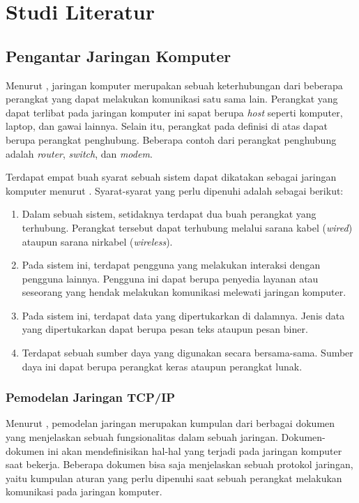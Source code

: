 \chapter{Studi Literatur}

\section{Pengantar Jaringan Komputer}
Menurut \textcite{forouzan2012}, jaringan komputer merupakan sebuah keterhubungan dari beberapa perangkat yang dapat melakukan komunikasi satu sama lain. Perangkat yang dapat terlibat pada jaringan komputer ini sapat berupa \emph{host} seperti komputer, laptop, dan gawai lainnya. Selain itu, perangkat pada definisi di atas dapat berupa perangkat penghubung. Beberapa contoh dari perangkat penghubung adalah \emph{router}, \emph{switch}, dan \emph{modem}.

Terdapat empat buah syarat sebuah sistem dapat dikatakan sebagai jaringan komputer menurut \textcite{pratama2015}. Syarat-syarat yang perlu dipenuhi adalah sebagai berikut:
\begin{enumerate}
  \item Dalam sebuah sistem, setidaknya terdapat dua buah perangkat yang terhubung. Perangkat tersebut dapat terhubung melalui sarana kabel (\emph{wired}) ataupun sarana nirkabel (\emph{wireless}).
  \item Pada sistem ini, terdapat pengguna yang melakukan interaksi dengan pengguna lainnya. Pengguna ini dapat berupa penyedia layanan atau seseorang yang hendak melakukan komunikasi melewati jaringan komputer.
  \item Pada sistem ini, terdapat data yang dipertukarkan di dalamnya. Jenis data yang dipertukarkan dapat berupa pesan teks ataupun pesan biner.
  \item Terdapat sebuah sumber daya yang digunakan secara bersama-sama. Sumber daya ini dapat berupa perangkat keras ataupun perangkat lunak.
\end{enumerate}

\subsection{Pemodelan Jaringan TCP/IP}
Menurut \textcite{odom2022}, pemodelan jaringan merupakan kumpulan dari berbagai dokumen yang menjelaskan sebuah fungsionalitas dalam sebuah jaringan. Dokumen-dokumen ini akan mendefinisikan hal-hal yang terjadi pada jaringan komputer saat bekerja. Beberapa dokumen bisa saja menjelaskan sebuah protokol jaringan, yaitu kumpulan aturan yang perlu dipenuhi saat sebuah perangkat melakukan komunikasi pada jaringan komputer.

